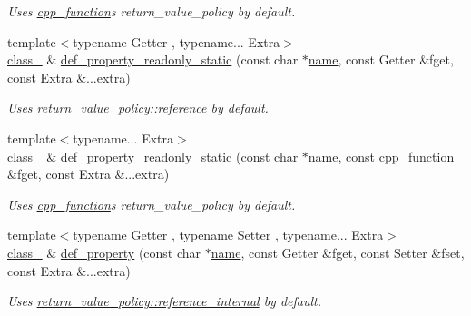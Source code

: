 \begin{DoxyCompactItemize}
\begin{DoxyCompactList}\small\item\em Uses \mbox{\hyperlink{classcpp__function}{cpp\+\_\+function}}\textquotesingle{}s return\+\_\+value\+\_\+policy by default. \end{DoxyCompactList}\item 
{\footnotesize template$<$typename Getter , typename... Extra$>$ }\\\mbox{\hyperlink{classclass__}{class\+\_\+}} \& \mbox{\hyperlink{classclass___afa89332683e8e7e134472d5dc83ba6b3}{def\+\_\+property\+\_\+readonly\+\_\+static}} (const char $\ast$\mbox{\hyperlink{structname}{name}}, const Getter \&fget, const Extra \&...extra)
\begin{DoxyCompactList}\small\item\em Uses \mbox{\hyperlink{detail_2common_8h_adde72ab1fb0dd4b48a5232c349a53841ab8af13ea9c8fe890c9979a1fa8dbde22}{return\+\_\+value\+\_\+policy\+::reference}} by default. \end{DoxyCompactList}\item 
{\footnotesize template$<$typename... Extra$>$ }\\\mbox{\hyperlink{classclass__}{class\+\_\+}} \& \mbox{\hyperlink{classclass___a84efdefa8be30cf8fe803793474430c1}{def\+\_\+property\+\_\+readonly\+\_\+static}} (const char $\ast$\mbox{\hyperlink{structname}{name}}, const \mbox{\hyperlink{classcpp__function}{cpp\+\_\+function}} \&fget, const Extra \&...extra)
\begin{DoxyCompactList}\small\item\em Uses \mbox{\hyperlink{classcpp__function}{cpp\+\_\+function}}\textquotesingle{}s return\+\_\+value\+\_\+policy by default. \end{DoxyCompactList}\item 
{\footnotesize template$<$typename Getter , typename Setter , typename... Extra$>$ }\\\mbox{\hyperlink{classclass__}{class\+\_\+}} \& \mbox{\hyperlink{classclass___a2f2cd90a7ae2f7895e0b0caadac82f6f}{def\+\_\+property}} (const char $\ast$\mbox{\hyperlink{structname}{name}}, const Getter \&fget, const Setter \&fset, const Extra \&...extra)
\begin{DoxyCompactList}\small\item\em Uses \mbox{\hyperlink{detail_2common_8h_adde72ab1fb0dd4b48a5232c349a53841aa39bc0596cb125c1605a78fbd287df7f}{return\+\_\+value\+\_\+policy\+::reference\+\_\+internal}} by default. \end{DoxyCompactList}\item 

\end{DoxyCompactItemize}
